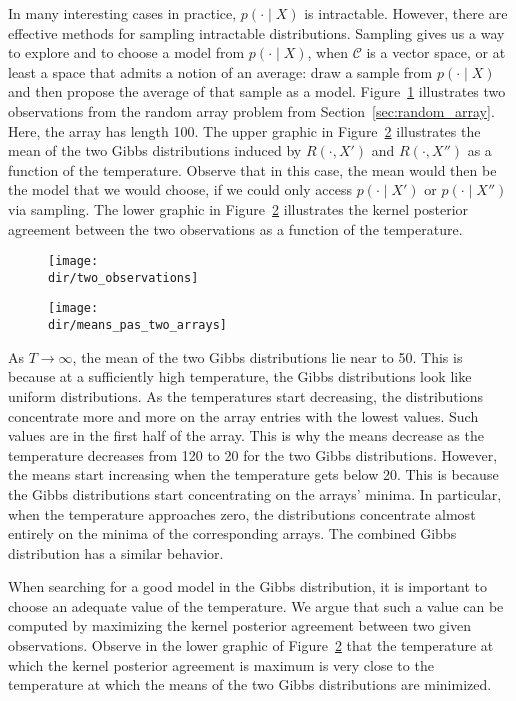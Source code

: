 In many interesting cases in practice, $p(\cdot \mid X)$ is intractable. However, there
are effective methods for sampling intractable distributions. Sampling gives
us a way to explore and to choose a model from $p(\cdot \mid X)$, when $\mathcal{C}$ is a vector
space, or at least a space that admits a notion of an average: draw a sample from $p(\cdot \mid X)$ and then propose the average of that sample as a model.
Figure~\ref{fig:two_observations_sa} illustrates two observations from the random array problem
from Section~\ref{sec:random_array}. Here, the array has length 100. The upper graphic in Figure~\ref{fig:means_pas_two_arrays} illustrates the mean of the two Gibbs distributions induced by
$R(\cdot, X')$ and $R(\cdot, X'')$ as a function of the temperature. Observe that in
this case, the mean would then be the model that we would choose, if we
could only access $p(\cdot \mid X')$ or $p(\cdot \mid X'')$ via sampling. The lower graphic in Figure~\ref{fig:means_pas_two_arrays}
illustrates the kernel posterior agreement between the two observations as
a function of the temperature.

\begin{figure}[hbtp]
\centering
\texttt{[image: \\dir/two\_observations]}
\caption{}
\label{fig:two_observations_sa}
\end{figure}

\begin{figure}[hbtp]
\centering
\texttt{[image: \\dir/means\_pas\_two\_arrays]}
\caption{}
\label{fig:means_pas_two_arrays}
\end{figure}

As $T \to \infty$, the mean of the two Gibbs distributions lie near to 50. This
is because at a sufficiently high temperature, the Gibbs distributions look
like uniform distributions. As the temperatures start decreasing, the distributions
concentrate more and more on the array entries with the lowest
values. Such values are in the first half of the array. This is why the means
decrease as the temperature decreases from 120 to 20 for the two Gibbs
distributions. However, the means start increasing when the temperature
gets below 20. This is because the Gibbs distributions start concentrating
on the arrays' minima. In particular, when the temperature approaches
zero, the distributions concentrate almost entirely on the minima of the
corresponding arrays. The combined Gibbs distribution has a similar behavior.

When searching for a good model in the Gibbs distribution, it is important
to choose an adequate value of the temperature. We argue that
such a value can be computed by maximizing the kernel posterior agreement
between two given observations. Observe in the lower graphic of
Figure~\ref{fig:means_pas_two_arrays} that the temperature at which the kernel posterior agreement is
maximum is very close to the temperature at which the means of the two Gibbs distributions are minimized.


